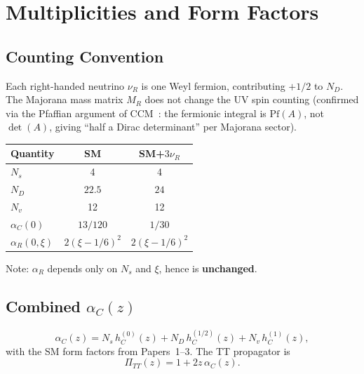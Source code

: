 \documentclass[11pt,a4paper]{article}
\begin{document}
\section{Multiplicities and Form Factors}

\subsection{Counting Convention}

Each right-handed neutrino $\nu_R$ is one Weyl fermion, contributing $+1/2$ to $N_D$.
The Majorana mass matrix $M_R$ does not change the UV spin counting
(confirmed via the Pfaffian argument of CCM~\cite{CCM2007}: the fermionic integral
is $\mathrm{Pf}(A)$, not $\det(A)$, giving ``half a Dirac determinant'' per Majorana sector).

\begin{center}
\begin{tabular}{lcc}
\toprule
\textbf{Quantity} & \textbf{SM} & \textbf{SM+$3\nu_R$} \\
\midrule
$N_s$ & 4 & 4 \\
$N_D$ & $22.5$ & $24$ \\
$N_v$ & 12 & 12 \\
$\alpha_C(0)$ & $13/120$ & $1/30$ \\
$\alpha_R(0,\xi)$ & $2(\xi-1/6)^2$ & $2(\xi-1/6)^2$ \\
\bottomrule
\end{tabular}
\end{center}

Note: $\alpha_R$ depends only on $N_s$ and $\xi$, hence is \textbf{unchanged}.

\subsection{Combined $\alpha_C(z)$}

\begin{equation}\label{eq:alphaC}
  \alpha_C(z) = N_s\,h_C^{(0)}(z) + N_D\,h_C^{(1/2)}(z) + N_v\,h_C^{(1)}(z),
\end{equation}
with the SM form factors from Papers~1--3.
The TT propagator is
\begin{equation}\label{eq:PiTT}
  \Pi_{TT}(z) = 1 + 2z\,\alpha_C(z).
\end{equation}


\end{document}
